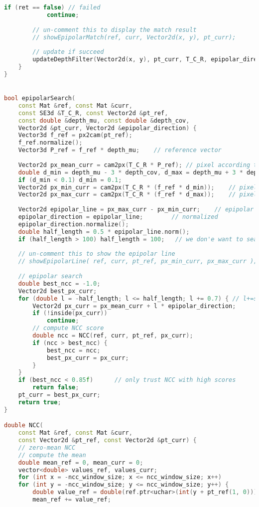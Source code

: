 \begin{lstlisting}[language=c++,caption=slambook2/ch12/dense\_monocular/dense\_mapping.cpp (part)]
		if (ret == false) // failed
			continue;
		
		// un-comment this to display the match result 
		// showEpipolarMatch(ref, curr, Vector2d(x, y), pt_curr);
		
		// update if succeed
		updateDepthFilter(Vector2d(x, y), pt_curr, T_C_R, epipolar_direction, depth, depth_cov2);
	}
}


bool epipolarSearch(
	const Mat &ref, const Mat &curr,
	const SE3d &T_C_R, const Vector2d &pt_ref,
	const double &depth_mu, const double &depth_cov,
	Vector2d &pt_curr, Vector2d &epipolar_direction) {
	Vector3d f_ref = px2cam(pt_ref);
	f_ref.normalize();
	Vector3d P_ref = f_ref * depth_mu;    // reference vector
	
	Vector2d px_mean_curr = cam2px(T_C_R * P_ref); // pixel according to mean depth
	double d_min = depth_mu - 3 * depth_cov, d_max = depth_mu + 3 * depth_cov;
	if (d_min < 0.1) d_min = 0.1;
	Vector2d px_min_curr = cam2px(T_C_R * (f_ref * d_min));    // pixel of minimal depth
	Vector2d px_max_curr = cam2px(T_C_R * (f_ref * d_max));    // pixel of maximal depth
	
	Vector2d epipolar_line = px_max_curr - px_min_curr;    // epipolar line
	epipolar_direction = epipolar_line;        // normalized
	epipolar_direction.normalize();
	double half_length = 0.5 * epipolar_line.norm();    
	if (half_length > 100) half_length = 100;   // we don'e want to search too much
	
	// un-comment this to show the epipolar line
	// showEpipolarLine( ref, curr, pt_ref, px_min_curr, px_max_curr );
	
	// epipolar search
	double best_ncc = -1.0;
	Vector2d best_px_curr;
	for (double l = -half_length; l <= half_length; l += 0.7) { // l+=sqrt(2)
		Vector2d px_curr = px_mean_curr + l * epipolar_direction;  
		if (!inside(px_curr))
			continue;
		// compute NCC score
		double ncc = NCC(ref, curr, pt_ref, px_curr);
		if (ncc > best_ncc) {
			best_ncc = ncc;
			best_px_curr = px_curr;
		}
	}
	if (best_ncc < 0.85f)      // only trust NCC with high scores
		return false;
	pt_curr = best_px_curr;
	return true;
}

double NCC(
	const Mat &ref, const Mat &curr,
	const Vector2d &pt_ref, const Vector2d &pt_curr) {
	// zero-mean NCC
	// compute the mean
	double mean_ref = 0, mean_curr = 0;
	vector<double> values_ref, values_curr;
	for (int x = -ncc_window_size; x <= ncc_window_size; x++)
	for (int y = -ncc_window_size; y <= ncc_window_size; y++) {
		double value_ref = double(ref.ptr<uchar>(int(y + pt_ref(1, 0)))[int(x + pt_ref(0, 0))]) / 255.0;
		mean_ref += value_ref;
		

\end{lstlisting}
